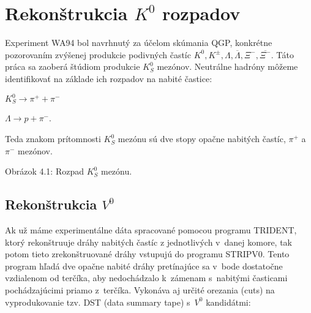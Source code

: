 \chapter{Rekonštrukcia $K^{0}$ rozpadov}
Experiment WA94 bol navrhnutý za účelom skúmania QGP, konkrétne pozorovaním
zvýšenej produkcie podivných častíc $K^{0}, K^{\pm}, \Lambda,
\overline{\Lambda}, \Xi^{-}, \overline{\Xi^{-}}$. Táto práca sa zaoberá
štúdiom produkcie $K^{0}_{S}$ mezónov. Neutrálne hadróny môžeme identifikovať
na základe ich rozpadov na nabité častice: \\
\begin{center}
  $K^{0}_{S} \longrightarrow \pi^{+} + \pi^{-}$ \\
\end{center}
\begin{center}
  $\Lambda \longrightarrow p + \pi^{-}$. \\
\end{center}
Teda znakom prítomnosti $K^{0}_{S}$ mezónu sú dve stopy opačne nabitých
častíc, $\pi^{+}$ a $\pi^{-}$ mezónov. \\
\vspace*{-5cm} \hspace*{-1cm} 

\vspace*{-3cm}
\begin{center}
  Obrázok 4.1: Rozpad $K^{0}_{S}$ mezónu.
\end{center}
\section{Rekonštrukcia $V^{0}$}
Ak už máme experimentálne  dáta spracované pomocou programu TRIDENT, ktorý
rekonštruuje  dráhy nabitých častíc z jednotlivých  v~danej
komore, tak potom tieto zrekonštruované dráhy vstupujú do programu STRIPV0.
Tento program hľadá dve opačne nabité dráhy pretínajúce sa  v~bode dostatočne
vzdialenom od terčíka, aby nedochádzalo k~zámenam s~nabitými časticami
pochádzajúcimi priamo z~terčíka. Vykonáva aj určité orezania (cuts)
na vyprodukovanie tzv. DST (data summary tape) s~$V^{0}$ kandidátmi:

